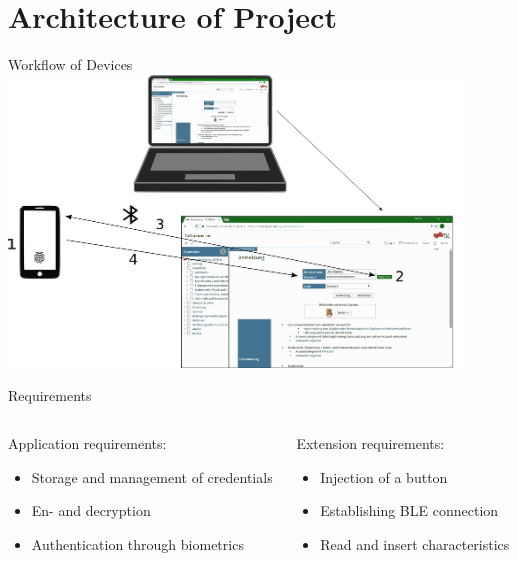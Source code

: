 \documentclass{beamer}
\begin{document}
\section{Architecture of Project}

\begin{frame}{Workflow of Devices}
\vspace{-3mm}
\centering
\includegraphics[width=0.9\textwidth]{images/Communication.png}
\end{frame}


\begin{frame}[shrink=8]{Requirements}
\begin{columns}[onlytextwidth]
	\begin{column}{0.45\textwidth}
		Application requirements:
		\begin{itemize}
			\item Storage and management of credentials
			\item En- and decryption
			\item Authentication through biometrics
		\end{itemize}
	\end{column}
	\begin{column}{0.47\textwidth}
		Extension requirements:
		\begin{itemize}
			\item Injection of a button
			\item Establishing BLE connection
			\item Read and insert characteristics
		\end{itemize}
	\end{column}
\end{columns} 
\end{frame}
\end{document}
